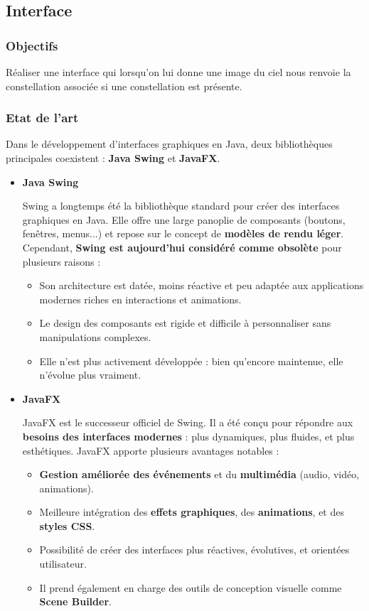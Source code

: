 \subsection{Interface}
\subsubsection{Objectifs}
Réaliser une interface qui lorsqu'on lui donne une image du ciel nous renvoie la constellation associée si une constellation est présente.

\subsubsection{Etat de l'art}

Dans le développement d’interfaces graphiques en Java, deux bibliothèques principales coexistent : \textbf{Java Swing} et \textbf{JavaFX}.

\begin{itemize}
    \item \textbf{Java Swing}

 Swing a longtemps été la bibliothèque standard pour créer des interfaces graphiques en Java. Elle offre une large panoplie de composants (boutons, fenêtres, menus...) et repose sur le concept de \textbf{modèles de rendu léger}. Cependant, \textbf{Swing est aujourd’hui considéré comme obsolète} pour plusieurs raisons :
    \begin{itemize}
        \item Son architecture est datée, moins réactive et peu adaptée aux applications modernes riches en interactions et animations.
        \item Le design des composants est rigide et difficile à personnaliser sans manipulations complexes.
        \item Elle n’est plus activement développée : bien qu'encore maintenue, elle n’évolue plus vraiment.
    \end{itemize}
    \item \textbf{JavaFX}

 JavaFX est le successeur officiel de Swing. Il a été conçu pour répondre aux \textbf{besoins des interfaces modernes} : plus dynamiques, plus fluides, et plus esthétiques. JavaFX apporte plusieurs avantages notables :
    \begin{itemize}
        \item \textbf{Gestion améliorée des événements} et du \textbf{multimédia} (audio, vidéo, animations).
        \item Meilleure intégration des \textbf{effets graphiques}, des \textbf{animations}, et des \textbf{styles CSS}.
        \item Possibilité de créer des interfaces plus réactives, évolutives, et orientées utilisateur.
        \item Il prend également en charge des outils de conception visuelle comme \textbf{Scene Builder}.
    \end{itemize}
\end{itemize}

